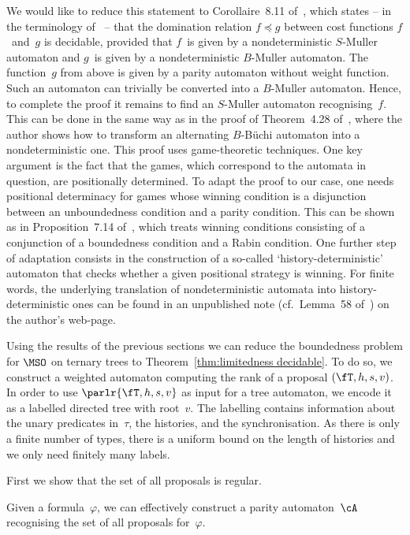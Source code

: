 \documentclass{LMCS}
\begin{document}
We would like to reduce this statement to Corollaire~8.11 of~\cite{Colcombet13},
which states -- in the terminology of~\cite{Colcombet13} --
that the domination relation $f \preceq g$ between cost functions
$f$~and~$g$ is decidable, provided that $f$~is given by a nondeterministic
$S$-Muller automaton and $g$~is given by a nondeterministic $B$-Muller
automaton.
The function~$g$ from above is given by a parity automaton without weight
function.
Such an automaton can trivially be converted into a $B$-Muller automaton.
Hence, to complete the proof it remains to find an $S$-Muller automaton
recognising~$f$.
This can be done in the same way as in the proof of Theorem~4.28
of~\cite{VandenBoom12}, where the author shows how to transform an
alternating $B$-B\"uchi automaton into a nondeterministic one.
This proof uses game-theoretic techniques.
One key argument is the fact that the games, which correspond to the
automata in question, are positionally determined.
To adapt the proof to our case, one needs positional determinacy for games
whose winning condition is a disjunction between an unboundedness condition
and a parity condition.
This can be shown as in Proposition~7.14 of~\cite{Colcombet13},
which treats winning conditions consisting of a conjunction of a boundedness
condition and a Rabin condition.
One further step of adaptation consists in the construction of a so-called
`history-deterministic' automaton that checks whether a given positional
strategy is winning.
For finite words, the underlying translation of nondeterministic automata into
history-deterministic ones can be found in an unpublished note
(cf.~Lemma~58 of~\cite{Colcombet09b}) on the author's web-page.

\medskip
Using the results of the previous sections we can reduce
the boundedness problem for $\MSO$ on ternary trees
to Theorem~\ref{thm:limitedness decidable}.
To do so, we construct a weighted automaton computing the rank of a proposal
$(\fT,h,s,v)$.
In order to use $\parlr{\fT,h,s,v}$ as input for a tree automaton,
we encode it as a labelled directed tree with root~$v$.
The labelling contains information about the unary predicates in~$\tau$,
the histories, and the synchronisation.
As there is only a finite number of types,
there is a uniform bound on the length of histories
and we only need finitely many labels.

First we show that the set of all proposals is regular.
\begin{lem}\label{lem: proposals are regular}
Given a formula~$\varphi$,
we can effectively construct a parity automaton~$\cA$ recognising
the set of all proposals for~$\varphi$.
\end{lem}
\end{document}
